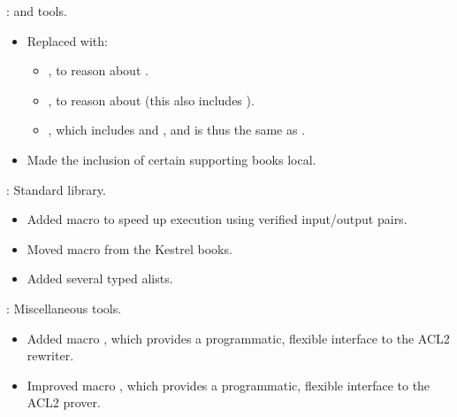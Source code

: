 
\begin{frame}

\implibtitle

:
 and  tools.
\begin{itemize}
\item Replaced  with:
      \begin{itemize}
      \item {}, to reason about .
      \item {}, to reason about 
            (this also includes ).
      \item {},
            which includes  and ,
            and is thus the same as .
      \end{itemize}
\item Made the inclusion of certain supporting books local.
\end{itemize}

\end{frame}


\begin{frame}

\implibtitle

:
Standard library.
\begin{itemize}
\item Added macro  to speed up execution
      using verified input/output pairs.
\item Moved macro  from the Kestrel books.
\item Added several typed alists.
\end{itemize}

\end{frame}


\begin{frame}

\implibtitle

: Miscellaneous tools.
\begin{itemize}
\item Added macro ,
      which provides a programmatic, flexible interface
      to the ACL2 rewriter.
\item Improved macro ,
      which provides a programmatic, flexible interface
      to the ACL2 prover.
\end{itemize}
\end{frame}

